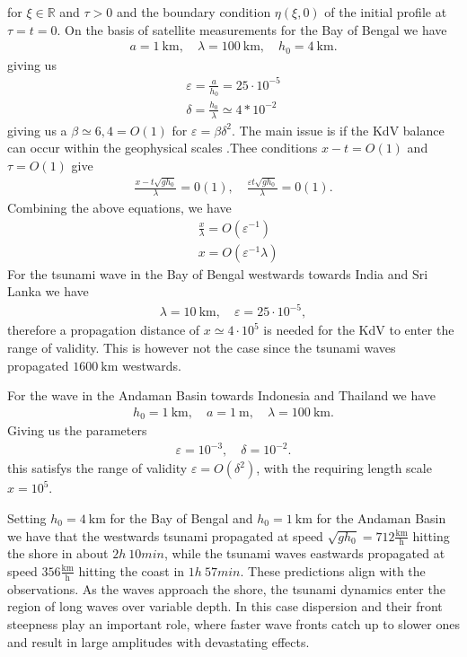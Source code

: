 for $\xi \in \mathbb{R}$ and $\tau > 0 $ and the boundary condition $\eta(\xi
,0)$ of the initial profile at $\tau = t = 0$. On the basis of satellite
measurements for the Bay of Bengal we have
\begin{align}
    a = 1\ \text{km}, \quad \lambda = 100\ \text{km},\quad h_0 = 4\
    \text{km}.
\end{align}
giving us
\begin{align}
    \varepsilon = \frac{a}{h_0} = 25 \cdot 10^{-5}\\
    \delta = \frac{h_0}{\lambda} \simeq 4*10^{-2}
\end{align}
giving us a $\beta \simeq 6,4 = O(1)$ for $\varepsilon = \beta \delta^2$.
The main issue is if the KdV balance can occur within the geophysical scales
.Thee conditions $x-t = O(1)$ and $\tau = O(1)$ give
\begin{align}
    \frac{x - t \sqrt{gh_0} }{\lambda} = 0(1),\quad \frac{\varepsilon t
    \sqrt{gh_0} }{\lambda} = 0(1).
\end{align}
Combining the above equations, we have
\begin{align}
   & \frac{x}{\lambda} = O(\varepsilon^{-1})\\
    &x  = O(\varepsilon^{-1}\lambda)
\end{align}
For the tsunami wave in the Bay of Bengal westwards towards India and Sri
Lanka we have
\begin{align}
    \lambda = 10\ \text{km}, \quad \varepsilon = 25 \cdot 10^{-5},
\end{align}
therefore a propagation distance of $x \simeq 4 \cdot 10^{5}$ is needed for
the KdV to enter the range of validity. This is however not the case since
the tsunami waves propagated $1600\ \text{km}$ westwards.

For the wave in the Andaman Basin towards Indonesia and Thailand we have
\begin{align}
    h_0 = 1\ \text{km}, \quad a = 1\ \text{m}, \quad \lambda = 100\
    \text{km}.
\end{align}
Giving us the parameters
\begin{align}
    \varepsilon  = 10^{-3}, \quad \delta = 10^{-2}.
\end{align}
this satisfys the range of validity  $\varepsilon = O(\delta^2)$, with the
requiring length scale $x = 10^{5}$.

Setting $h_0 = 4\ \text{km}$ for the Bay of Bengal and $h_0 = 1\ \text{km}$
for the Andaman Basin we have that the westwards tsunami propagated at speed
$\sqrt{gh_0}  = 712 \frac{\text{km}}{\text{h}}$ hitting the shore in about
$2h\ 10min$, while the tsunami waves eastwards propagated at speed $356
\frac{\text{km}}{\text{h}}$ hitting the coast in $1h\ 57min$. These
predictions align with the observations. As the waves approach the shore, the
tsunami dynamics enter the region of long waves over variable depth. In this
case dispersion and their front steepness play an important role, where
faster wave fronts catch up to slower ones and result in large amplitudes
with devastating effects.








